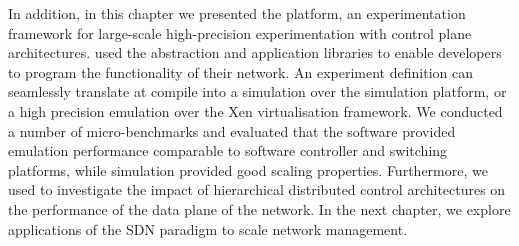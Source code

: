 In addition, in this chapter we presented the \sdnsim platform, an experimentation
framework for large-scale high-precision experimentation with control plane
architectures. \sdnsim used the \mirage abstraction and application libraries to enable
developers to program the functionality of their network. An \sdnsim experiment
definition can seamlessly translate at compile into a simulation over the 
simulation platform, or a high precision emulation over the Xen virtualisation
framework. We conducted a number of micro-benchmarks and evaluated that the
software provided emulation performance comparable to software \of controller and
switching platforms, while \sdnsim simulation provided good scaling properties.
Furthermore, we used \sdnsim to investigate the impact of hierarchical distributed
control architectures on the performance of the data plane of the network.  In
the next chapter, we explore applications of the SDN paradigm to scale network
management. 
